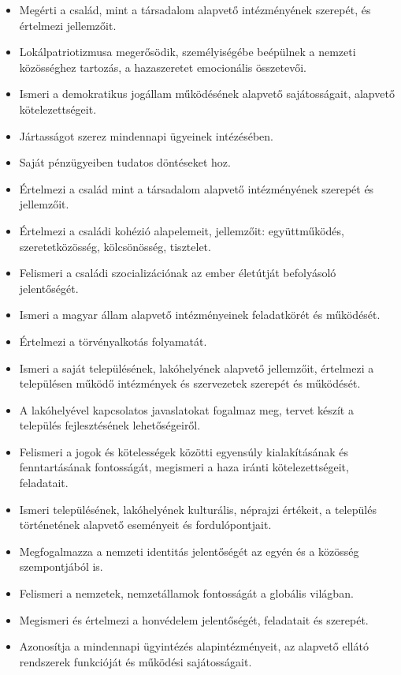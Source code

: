 \begin{itemize}
\item
  Megérti a család, mint a társadalom alapvető intézményének szerepét,
  és értelmezi jellemzőit.
\item
  Lokálpatriotizmusa megerősödik, személyiségébe beépülnek a nemzeti
  közösséghez tartozás, a hazaszeretet emocionális összetevői.
\item
  Ismeri a demokratikus jogállam működésének alapvető sajátosságait,
  alapvető kötelezettségeit.
\item
  Jártasságot szerez mindennapi ügyeinek intézésében.
\item
  Saját pénzügyeiben tudatos döntéseket hoz.
\item
  Értelmezi a család mint a társadalom alapvető intézményének szerepét
  és jellemzőit.
\item
  Értelmezi a családi kohézió alapelemeit, jellemzőit: együttműködés,
  szeretetközösség, kölcsönösség, tisztelet.
\item
  Felismeri a családi szocializációnak az ember életútját befolyásoló
  jelentőségét.
\item
  Ismeri a magyar állam alapvető intézményeinek feladatkörét és
  működését.
\item
  Értelmezi a törvényalkotás folyamatát.
\item
  Ismeri a saját településének, lakóhelyének alapvető jellemzőit,
  értelmezi a településen működő intézmények és szervezetek szerepét és
  működését.
\item
  A lakóhelyével kapcsolatos javaslatokat fogalmaz meg, tervet készít a
  település fejlesztésének lehetőségeiről.
\item
  Felismeri a jogok és kötelességek közötti egyensúly kialakításának és
  fenntartásának fontosságát, megismeri a haza iránti kötelezettségeit,
  feladatait.
\item
  Ismeri településének, lakóhelyének kulturális, néprajzi értékeit, a
  település történetének alapvető eseményeit és fordulópontjait.
\item
  Megfogalmazza a nemzeti identitás jelentőségét az egyén és a közösség
  szempontjából is.
\item
  Felismeri a nemzetek, nemzetállamok fontosságát a globális világban.
\item
  Megismeri és értelmezi a honvédelem jelentőségét, feladatait és
  szerepét.
\item
  Azonosítja a mindennapi ügyintézés alapintézményeit, az alapvető
  ellátó rendszerek funkcióját és működési sajátosságait.

\end{itemize}
